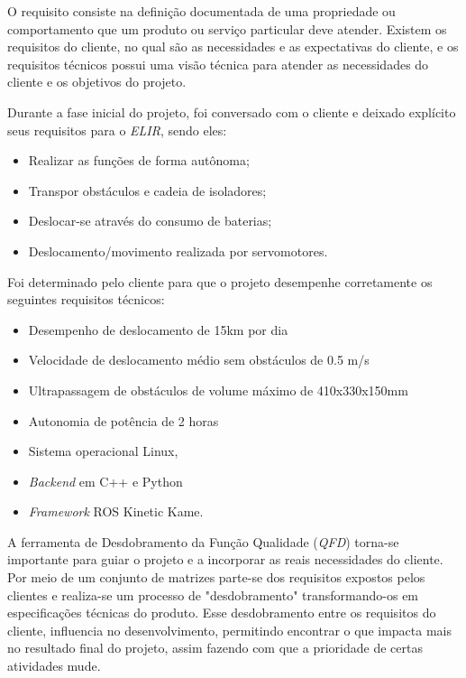 O requisito consiste na definição documentada  de uma propriedade ou comportamento que um produto ou serviço particular deve atender. Existem os requisitos do cliente, no qual são as necessidades e as expectativas do cliente, e os requisitos técnicos possui uma visão técnica para atender as necessidades do cliente e os objetivos do projeto.

Durante a fase inicial do projeto, foi conversado com o cliente e deixado explícito seus requisitos para o \textit{ELIR}, sendo eles:

\begin{itemize}
	\item Realizar as funções de forma autônoma;
	
	\item Transpor obstáculos e cadeia de isoladores;
	
	\item Deslocar-se através do consumo de baterias;
	
    \item Deslocamento/movimento realizada por servomotores.
    
\end{itemize}

Foi determinado pelo cliente para que o projeto desempenhe corretamente os seguintes requisitos técnicos:
\begin{itemize}
	\item Desempenho de deslocamento de 15km por dia
	
	
	\item Velocidade de deslocamento médio  sem obstáculos de 0.5 m/s
	
	
	\item Ultrapassagem de obstáculos de volume máximo de  410x330x150mm
	
	\item Autonomia de potência de 2 horas
    \item Sistema operacional Linux, 
	\item \textit{Backend} em C++ e Python
	\item \textit{Framework} ROS Kinetic Kame.
	
	
\end{itemize}

A ferramenta de Desdobramento da Função Qualidade (\textit{QFD}) torna-se importante para guiar o projeto e a incorporar as reais necessidades do cliente.  Por meio de um conjunto de matrizes parte-se dos requisitos expostos pelos clientes e realiza-se um processo de "desdobramento" transformando-os em especificações técnicas do produto. Esse desdobramento entre os requisitos do cliente, influencia no desenvolvimento, permitindo encontrar o que impacta mais no resultado final do projeto, assim fazendo com que a prioridade de certas atividades mude.

